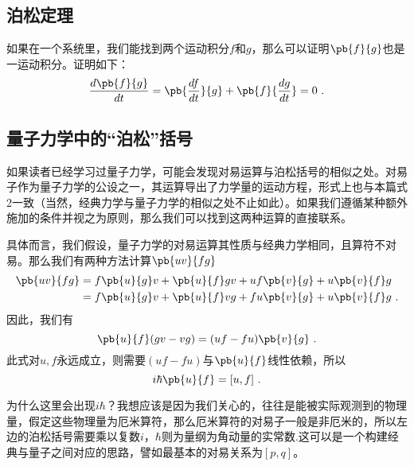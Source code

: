 \subsection{泊松定理}
如果在一个系统里，我们能找到两个运动积分$f$和$g$，那么可以证明$\pb{f}{g}$也是一运动积分。证明如下：
\begin{equation}
\frac{d\pb{f}{g}}{dt}=\pb{\frac{df}{dt}}{g}+\pb{f}{\frac{dg}{dt}}=0~.
\end{equation}

\subsection{量子力学中的“泊松”括号}
如果读者已经学习过量子力学，可能会发现对易运算与泊松括号的相似之处。对易子作为量子力学的公设之一，其运算导出了力学量的运动方程，形式上也与本篇式2一致（当然，经典力学与量子力学的相似之处不止如此）。如果我们遵循某种额外施加的条件并视之为原则，那么我们可以找到这两种运算的直接联系。

具体而言，我们假设，量子力学的对易运算其性质与经典力学相同，且算符不对易。那么我们有两种方法计算$\pb{uv}{fg}$
\begin{equation}
\begin{aligned}
\pb{uv}{fg}&=f\pb{u}{g}v+\pb{u}{f}gv+uf\pb{v}{g}+u\pb{v}{f}g\\
&=f\pb{u}{g}v+\pb{u}{f}vg+fu\pb{v}{g}+u\pb{v}{f}g~.
\end{aligned}
\end{equation}
因此，我们有
\begin{equation}
\pb{u}{f}(gv-vg)=(uf-fu)\pb{v}{g}~.
\end{equation}
此式对$u,f$永远成立，则需要$(uf-fu)$与$\pb{u}{f}$线性依赖，所以
\begin{equation}
i\hbar\pb{u}{f}=[u,f]~.
\end{equation}

为什么这里会出现$i\hbar$？我想应该是因为我们关心的，往往是能被实际观测到的物理量，假定这些物理量为厄米算符，那么厄米算符的对易子一般是非厄米的，所以左边的泊松括号需要乘以复数$i$，$\hbar$则为量纲为角动量的实常数.这可以是一个构建经典与量子之间对应的思路，譬如最基本的对易关系为$[p,q]$。

